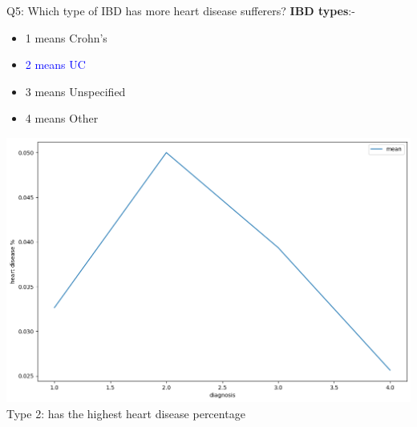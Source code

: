 \documentclass[8pt]{beamer}
\begin{document}
        \begin{frame}{Q5: Which type of IBD has more heart disease sufferers?}
            \textbf{IBD types}:-
            \begin{itemize}
                \item 1 means Crohn's
                \item \textcolor{blue}{2 means UC}
                \item 3 means Unspecified
                \item 4 means Other
            \end{itemize}
            \begin{center}
                \includegraphics[height=.55\textheight]{images/heart.png}\\
                Type 2: has the highest heart disease percentage
            \end{center}
        \end{frame}
\end{document}
